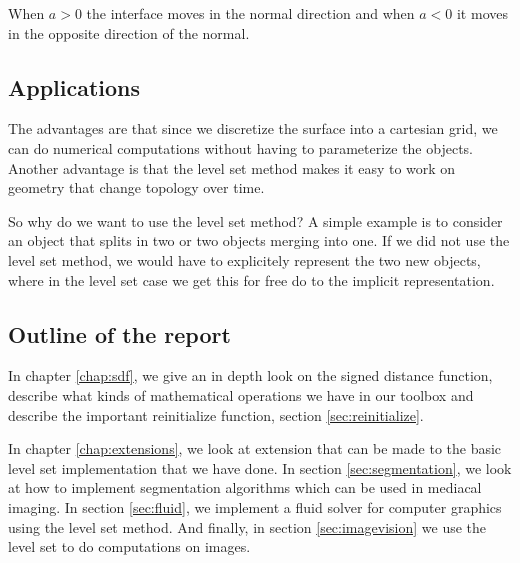 When $a > 0$ the interface moves in the normal direction and when $a < 0$ it moves in the opposite direction of the normal.

\subsection{Applications}

The advantages are that since we discretize the surface into a cartesian grid, we can do numerical computations without having to parameterize the objects. Another advantage is that the level set method makes it easy to work on geometry that change topology over time.


So why do we want to use the level set method? A simple example is to consider an object that splits in two or two objects merging into one. If we did not use the level set method, we would have to explicitely represent the two new objects, where in the level set case we get this for free do to the implicit representation.


\subsection{Outline of the report}

In chapter \vref{chap:sdf}, we give an in depth look on the signed distance function, describe what kinds of mathematical operations we have in our toolbox and describe the important reinitialize function, section \vref{sec:reinitialize}.

In chapter \vref{chap:extensions}, we look at extension that can be made to the basic level set implementation that we have done. In section \vref{sec:segmentation}, we look at how to implement segmentation algorithms which can be used in mediacal imaging. In section \vref{sec:fluid}, we implement a fluid solver for computer graphics using the level set method. And finally, in section \vref{sec:imagevision} we use the level set to do computations on images.





